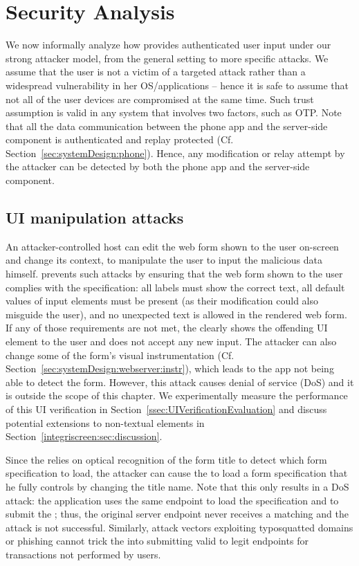 \section{Security Analysis} 
\label{integriscreen:sec:securityAnalysis}


We now informally analyze how \sysname provides authenticated user input under our strong attacker model, from the general setting to more specific attacks.
We assume that the user is not a victim of a targeted attack rather than a widespread vulnerability in her OS/applications -- hence it is safe to assume that not all of the user devices are compromised at the same time. Such trust assumption is valid in any system that involves two factors, such as OTP. Note that all the data communication between the \sysname phone app and the server-side component is authenticated and replay protected (Cf. Section~\ref{sec:systemDesign:phone}). Hence, any modification or relay attempt by the attacker can be detected by both the phone app and the server-side component.


\subsection{UI manipulation attacks}

An attacker-controlled host can edit the web form shown to the user on-screen and change its context, to manipulate the user to input the malicious data himself. \name prevents such attacks by ensuring that the web form shown to the user complies with the specification: all labels must show the correct text, all default values of input elements must be present (as their modification could also misguide the user), and no unexpected text is allowed in the rendered web form. If any of those requirements are not met, the \app clearly shows the offending UI element to the user and does not accept any new input. The attacker can also change some of the form's visual instrumentation (Cf. Section~\ref{sec:systemDesign:webserver:instr}), which leads to the \sysname app not being able to detect the form. However, this attack causes denial of service (DoS) and it is outside the scope of this chapter.
We experimentally measure the performance of this UI verification in Section~\ref{ssec:UIVerificationEvaluation} and discuss potential extensions to non-textual elements in Section~\ref{integriscreen:sec:discussion}.


Since the \app relies on optical recognition of the form title to detect which form specification to load, the attacker can cause the \app to load a form specification that he fully controls by changing the title name.
Note that this only results in a DoS attack: the application uses the same endpoint to load the specification and to submit the \POI; thus, the original server endpoint never receives a matching \POI and the attack is not successful.
Similarly, attack vectors exploiting typosquatted domains or phishing cannot trick the \app into submitting valid \PsOI to legit endpoints for transactions not performed by users.


